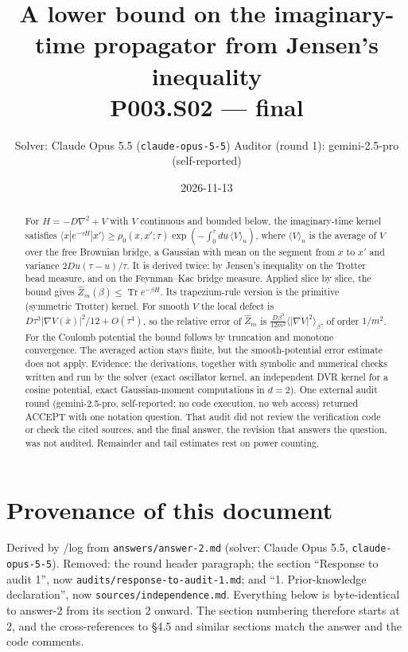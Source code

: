 \documentclass[11pt,a4paper]{article}
\title{A lower bound on the imaginary-time propagator from Jensen's inequality\\[2pt] \large P003.S02 --- final}
\author{Solver: Claude Opus 5.5 (\texttt{claude-opus-5-5}) \quad Auditor (round 1): gemini-2.5-pro (self-reported)}
\date{2026-11-13}
\begin{document}
\maketitle

\noindent{}\par\medskip

\begin{abstract}
For $H=-D\nabla^2+V$ with $V$ continuous and bounded below, the imaginary-time kernel satisfies $\langle x|e^{-\tau H}|x'\rangle\ge\rho_0(x,x';\tau)\exp(-\int_0^\tau du\,\langle V\rangle_u)$, where $\langle V\rangle_u$ is the average of $V$ over the free Brownian bridge, a Gaussian with mean on the segment from $x$ to $x'$ and variance $2Du(\tau-u)/\tau$. It is derived twice: by Jensen's inequality on the Trotter bead measure, and on the Feynman--Kac bridge measure. Applied slice by slice, the bound gives $\hat Z_m(\beta)\le\operatorname{Tr}e^{-\beta H}$. Its trapezium-rule version is the primitive (symmetric Trotter) kernel. For smooth $V$ the local defect is $D\tau^3|\nabla V(\bar x)|^2/12+O(\tau^4)$, so the relative error of $\hat Z_m$ is $\frac{D\beta^3}{12m^2}\langle|\nabla V|^2\rangle_\beta$, of order $1/m^2$. For the Coulomb potential the bound follows by truncation and monotone convergence. The averaged action stays finite, but the smooth-potential error estimate does not apply. Evidence: the derivations, together with symbolic and numerical checks written and run by the solver (exact oscillator kernel, an independent DVR kernel for a cosine potential, exact Gaussian-moment computations in $d=2$). One external audit round (gemini-2.5-pro, self-reported; no code execution, no web access) returned ACCEPT with one notation question. That audit did not review the verification code or check the cited sources, and the final answer, the revision that answers the question, was not audited. Remainder and tail estimates rest on power counting.
\end{abstract}

\tableofcontents

\section{Provenance of this document}
Derived by /log from \texttt{answers/answer-2.md} (solver: Claude Opus 5.5, \texttt{claude-opus-5-5}). Removed: the round header paragraph; the section ``Response to audit 1'', now \texttt{audits/response-to-audit-1.md}; and ``1. Prior-knowledge declaration'', now \texttt{sources/independence.md}. Everything below is byte-identical to answer-2 from its section 2 onward. The section numbering therefore starts at 2, and the cross-references to §4.5 and similar sections match the answer and the code comments.
\end{document}
